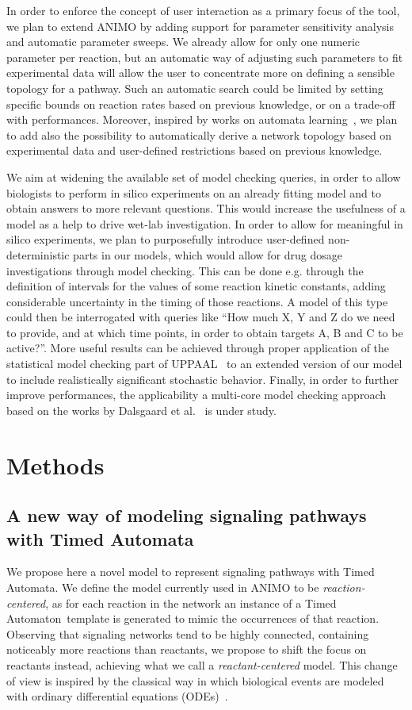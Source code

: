 \documentclass{bmcart}
\def\ta{Timed Automaton}
\def\tas{Timed Automata}
\begin{document}
In order to enforce the concept of user interaction as a primary focus of the tool, we plan to extend
ANIMO by adding support for parameter sensitivity analysis and automatic parameter sweeps.
We already allow for only one numeric parameter per reaction, but an automatic way of adjusting such
parameters to fit experimental data will allow the user to concentrate more on defining a sensible topology for a pathway.
Such an automatic search could be limited by setting specific bounds on reaction rates based on previous knowledge,
or on a trade-off with performances.
Moreover, inspired by works on automata learning~\cite{test-based-modelling}, we plan to add also the possibility
to automatically derive a network topology based on experimental data and user-defined restrictions based on
previous knowledge.

We aim at widening the available set of model checking queries, in order to allow biologists to perform
in silico experiments on an already fitting model and to obtain answers to more relevant questions.
This would increase the usefulness of a model as a help to drive wet-lab investigation.
In order to allow for meaningful in silico experiments, we plan to purposefully introduce user-defined non-deterministic 
parts in our models, which would allow for drug dosage investigations through model checking.
This can be done e.g. through the definition of intervals for the values of some reaction kinetic constants,
adding considerable uncertainty in the timing of those reactions.
A model of this type could then be interrogated with queries like ``How much X, Y and Z do we need to provide,
and at which time points, in order to obtain targets A, B and C to be active?''.
More useful results can be achieved through proper application of the statistical model checking part of UPPAAL~\cite{uppaal-smc} to
an extended version of our model to include realistically significant stochastic behavior.
Finally, in order to further improve performances, the applicability a multi-core model checking approach based on the
works by Dalsgaard et al.~\cite{uppaal-multi-core1}
is under study.



\section*{Methods}

\subsection*{A new way of modeling signaling pathways with \tas}\label{sec:animo-new}
We propose here a novel model to represent signaling pathways with \tas.
We define the model currently used in ANIMO to be \emph{reaction-centered}, as for each reaction
in the network an instance of a \ta\ template is generated to mimic
the occurrences of that reaction. Observing that signaling
networks tend to be highly connected, containing noticeably more reactions than reactants,
we propose to shift the focus on reactants instead, achieving what we call a \emph{reactant-centered} model.
This change of view is inspired by the classical way in which biological events are modeled
with ordinary differential equations (ODEs)~\cite{ode-ma-anche-altro}.
\end{document}
